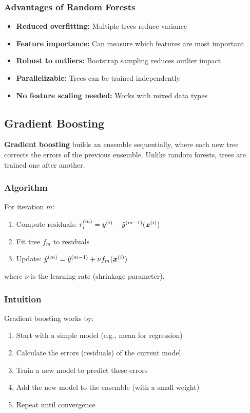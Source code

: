 \subsubsection{Advantages of Random Forests}

\begin{itemize}
    \item \textbf{Reduced overfitting:} Multiple trees reduce variance
    \item \textbf{Feature importance:} Can measure which features are most important
    \item \textbf{Robust to outliers:} Bootstrap sampling reduces outlier impact
    \item \textbf{Parallelizable:} Trees can be trained independently
    \item \textbf{No feature scaling needed:} Works with mixed data types
\end{itemize}

\subsection{Gradient Boosting}

\textbf{Gradient boosting} builds an ensemble sequentially, where each new tree corrects the errors of the previous ensemble. Unlike random forests, trees are trained one after another.

\subsubsection{Algorithm}

For iteration $m$:
\begin{enumerate}
    \item Compute residuals: $r_i^{(m)} = y^{(i)} - \hat{y}^{(m-1)}(\boldsymbol{x}^{(i)})$
    \item Fit tree $f_m$ to residuals
    \item Update: $\hat{y}^{(m)} = \hat{y}^{(m-1)} + \nu f_m(\boldsymbol{x}^{(i)})$
\end{enumerate}

where $\nu$ is the learning rate (shrinkage parameter).

\subsubsection{Intuition}

Gradient boosting works by:
\begin{enumerate}
    \item Start with a simple model (e.g., mean for regression)
    \item Calculate the errors (residuals) of the current model
    \item Train a new model to predict these errors
    \item Add the new model to the ensemble (with a small weight)
    \item Repeat until convergence
\end{enumerate}

